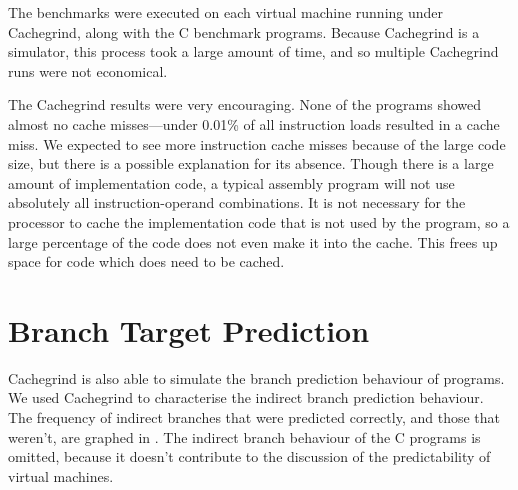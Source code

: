 		The benchmarks were executed on each virtual machine running under Cachegrind, along with the C benchmark programs. Because Cachegrind is a simulator, this process took a large amount of time, and so multiple Cachegrind runs were not economical. 
		
		The Cachegrind results were very encouraging. None of the programs showed almost no cache misses---under 0.01\% of all instruction loads resulted in a cache miss. We expected to see more instruction cache misses because of the large code size, but there is a possible explanation for its absence. Though there is a large amount of implementation code, a typical assembly program will not use absolutely all instruction-operand combinations. It is not necessary for the processor to cache the implementation code that is not used by the program, so a large percentage of the code does not even make it into the cache. This frees up space for code which does need to be cached.
		
		\section{Branch Target Prediction}
		Cachegrind is also able to simulate the branch prediction behaviour of programs. We used Cachegrind to characterise the indirect branch prediction behaviour. The frequency of indirect branches that were predicted correctly, and those that weren't, are graphed in . The indirect branch behaviour of the C programs is omitted, because it doesn't contribute to the discussion of the predictability of virtual machines.
		
